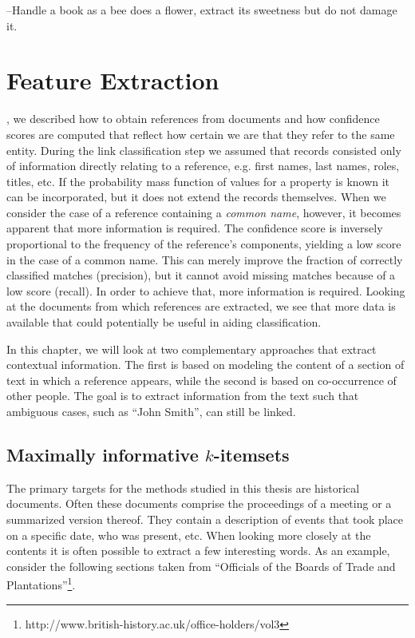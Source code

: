 \begin{savequote}[75mm] 
--Handle a book as a bee does a flower, extract its sweetness but do not damage it.
\end{savequote}




\chapter{Feature Extraction}
\label{ch:feature_extraction}

, we described how to obtain references from documents and how confidence scores are computed that reflect how certain we are that they refer to the same entity.
During the link classification step we assumed that records consisted only of information directly relating to a reference, e.g. first names, last names, roles, titles, etc.
If the probability mass function of values for a property is known it can be incorporated, but it does not extend the records themselves.
When we consider the case of a reference containing a \emph{common name}, however, it becomes apparent that more information is required.
The confidence score is inversely proportional to the frequency of the reference's components, yielding a low score in the case of a common name.
This can merely improve the fraction of correctly classified matches (precision), but it cannot avoid missing matches because of a low score (recall).
In order to achieve that, more information is required.
Looking at the documents from which references are extracted, we see that more data is available that could potentially be useful in aiding classification.

In this chapter, we will look at two complementary approaches that extract contextual information.
The first is based on modeling the content of a section of text in which a reference appears, while the second is based on co-occurrence of other people.
The goal is to extract information from the text such that ambiguous cases, such as ``John Smith'', can still be linked.




\section{Maximally informative $k$-itemsets}
\label{sec:miki}

The primary targets for the methods studied in this thesis are historical documents.
Often these documents comprise the proceedings of a meeting or a summarized version thereof.
They contain a description of events that took place on a specific date, who was present, etc.
When looking more closely at the contents it is often possible to extract a few interesting words.
As an example, consider the following sections taken from ``Officials of the Boards of Trade and Plantations''\footnote{http://www.british-history.ac.uk/office-holders/vol3}.

